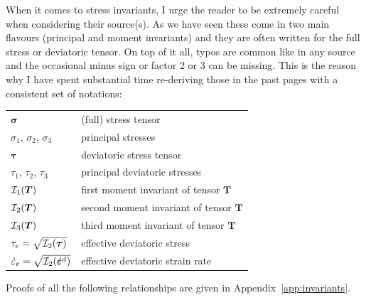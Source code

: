 When it comes to stress invariants, I urge the reader to be extremely careful when considering 
their source(s). As we have seen these come in two main flavours (principal and moment invariants)
and they are often written for the full stress or deviatoric tensor. On top of it all, 
typos are common like in any source and the occasional minus sign or factor 2 or 3 can be missing.
This is the reason why I have spent substantial time re-deriving those in the past pages 
with a consistent set of notations:
\begin{center}
\begin{tabular}{ll}
\hline
${\bm \sigma}$ & (full) stress tensor \\
$\sigma_1$, $\sigma_2$, $\sigma_3$ & principal stresses \\ 
${\bm \tau}$   & deviatoric stress tensor \\
$\tau_1$, $\tau_2$, $\tau_3$ & principal deviatoric stresses \\ 
${\cal I}_1({\bm T})$ & first moment invariant of tensor ${\bm T}$ \\
${\cal I}_2({\bm T})$ & second moment invariant of tensor ${\bm T}$ \\
${\cal I}_3({\bm T})$ & third moment invariant of tensor ${\bm T}$ \\
${\tau}_{e}=\sqrt{{\cal I}_2({\bm \tau})}$ & effective deviatoric stress \\
$\dot{{\varepsilon}}_{e}=\sqrt{{\cal I}_2(\dot{\bm \varepsilon}^d)}$ & effective deviatoric strain rate \\
\hline
\end{tabular}
\end{center}
Proofs of all the following relationships are given in Appendix~\ref{app:invariants}.

